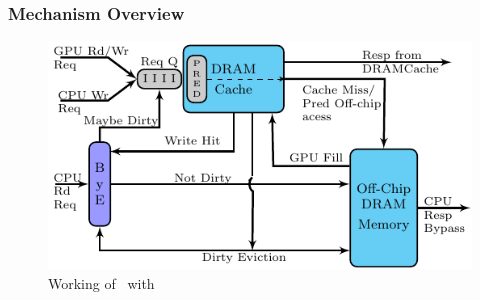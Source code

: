 \subsubsection{Mechanism Overview}

\begin{figure}[htb]
	\centering
	\includegraphics[scale=1.5]{figures/bloom}	
	\caption{Working of \cachename\ with \bypassname}
	\label{fig:bye}
\end{figure}

